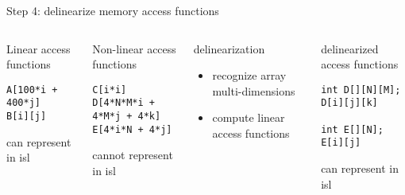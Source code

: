 \documentclass{beamer}
\begin{document}
\begin{frame}[fragile]{Step 4: delinearize memory access functions}
  \begin{columns}[T,onlytextwidth] %
    \begin{block}{\small Linear access functions}
      \begin{lstlisting}
A[100*i + 400*j]
B[i][j]
      \end{lstlisting}
      {\small \color{myblue} can represent in isl}
    \end{block}

    \vspace{.7cm}
    \pause
    \begin{block}{\small Non-linear access functions} 
      \begin{lstlisting}
C[i*i]
D[4*N*M*i + 4*M*j + 4*k]
E[4*i*N + 4*j]
      \end{lstlisting}

      {\small \color{myred} cannot represent in isl}
    \end{block}
    \pause
    \begin{block}{\small delinearization}
      \begin{itemize}
      \item recognize array multi-dimensions
      \item compute linear access functions
      \end{itemize}
    \end{block}
    \pause
    \begin{block}{\small delinearized access functions}
      \begin{lstlisting}
int D[][N][M];
D[i][j][k]

int E[][N];
E[i][j]
      \end{lstlisting}

      {\small \color{myblue} can represent in isl}
    \end{block}
  \end{columns}
\end{frame}
\end{document}

